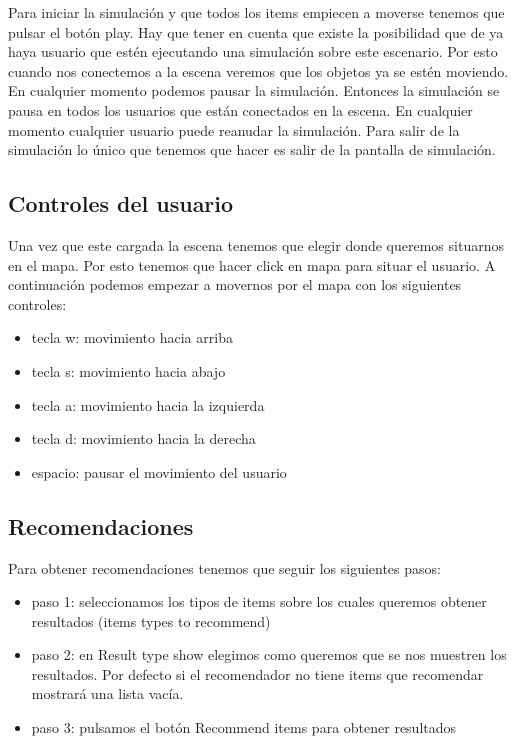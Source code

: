 Para iniciar la simulación y que todos los items empiecen a moverse tenemos que pulsar el botón play. Hay que tener en cuenta que existe la posibilidad que de ya haya usuario que estén ejecutando una simulación sobre este escenario. Por esto cuando nos conectemos a la escena veremos que los objetos ya se estén moviendo. En cualquier momento podemos pausar la simulación. Entonces la simulación se pausa en todos los usuarios que están conectados en la escena. En cualquier momento cualquier usuario puede reanudar la simulación. Para salir de la simulación lo único que tenemos que hacer es salir de la pantalla de simulación.

\subsection{Controles del usuario}

Una vez que este cargada la escena tenemos que elegir donde queremos situarnos en el mapa. Por esto tenemos que hacer click en mapa para situar el usuario. A continuación podemos empezar a movernos por el mapa con los siguientes controles:

\begin{itemize}
	\item tecla w: movimiento hacia arriba
	\item tecla s: movimiento hacia abajo
	\item tecla a: movimiento hacia la izquierda
	\item tecla d: movimiento hacia la derecha
	\item espacio: pausar el movimiento del usuario
\end{itemize}

\subsection{Recomendaciones}

Para obtener recomendaciones tenemos que seguir los siguientes pasos:

\begin{itemize}
	\item paso 1: seleccionamos los tipos de items sobre los cuales queremos obtener resultados (items types to recommend)
	\item paso 2: en Result type show elegimos como queremos que se nos muestren los resultados. Por defecto si el recomendador no tiene items que recomendar mostrará una lista vacía.
	\item paso 3: pulsamos el botón Recommend items para obtener resultados
\end{itemize}

